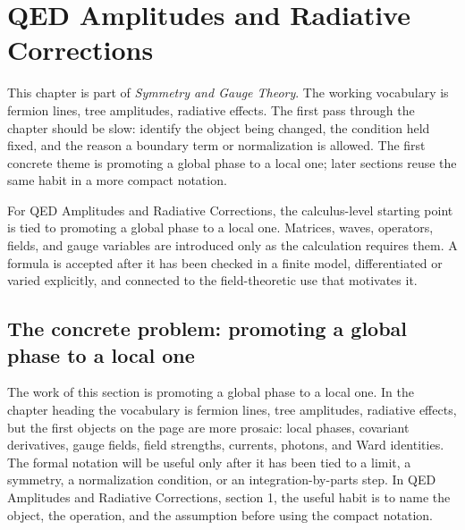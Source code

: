 \chapter{QED Amplitudes and Radiative Corrections}


This chapter is part of \emph{Symmetry and Gauge Theory}.  The working vocabulary is fermion lines, tree amplitudes, radiative effects.  The first pass through the chapter should be slow: identify the object being changed, the condition held fixed, and the reason a boundary term or normalization is allowed.  The first concrete theme is promoting a global phase to a local one; later sections reuse the same habit in a more compact notation.

For QED Amplitudes and Radiative Corrections, the calculus-level starting point is tied to promoting a global phase to a local one.  Matrices, waves, operators, fields, and gauge variables are introduced only as the calculation requires them.  A formula is accepted after it has been checked in a finite model, differentiated or varied explicitly, and connected to the field-theoretic use that motivates it.

\section{The concrete problem: promoting a global phase to a local one}













The work of this section is promoting a global phase to a local one.  In the chapter heading the vocabulary is fermion lines, tree amplitudes, radiative effects, but the first objects on the page are more prosaic: local phases, covariant derivatives, gauge fields, field strengths, currents, photons, and Ward identities.  The formal notation will be useful only after it has been tied to a limit, a symmetry, a normalization condition, or an integration-by-parts step.  In QED Amplitudes and Radiative Corrections, section 1, the useful habit is to name the object, the operation, and the assumption before using the compact notation.

